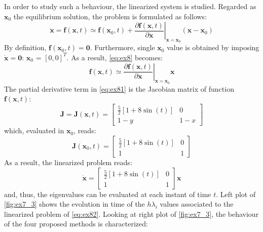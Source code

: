 \documentclass[11pt,a4paper,oneside]{article}
\renewcommand{\vec}[1]{\mathbf{#1}}
\begin{document}
In order to study such a behaviour, the linearized system is studied. Regarded as $\vec{x}_0$ the equilibrium solution, the problem is formulated as follows:
\begin{equation}
    \dot{\vec{x}} = \vec{f}(\vec{x}, t) \simeq \vec{f}(\vec{x}_0, t) + \left.\frac{\partial \vec{f}(\vec{x}, t)}{\partial \vec{x}} \right\rvert_{\vec{x}=\vec{x}_0}(\vec{x}-\vec{x}_0)
    \label{eq:ex8}
\end{equation}
By definition, $\vec{f}(\vec{x}_0,t) = \vec{0}$. Furthermore, single $\vec{x}_0$ value is obtained by imposing $\dot{\vec{x}}=\vec{0}$: $\vec{x}_0$ = $[0, 0]^T$. As a result, \autoref{eq:ex8} becomes:
\begin{equation}
    \vec{f}(\vec{x}, t) \simeq \left.\frac{\partial \vec{f}(\vec{x}, t)}{\partial \vec{x}} \right\rvert_{\vec{x}=\vec{x}_0} \vec{x}
    \label{eq:ex81}
\end{equation}
The partial derivative term in \autoref{eq:ex81} is the Jacobian matrix of function $\vec{f}(\vec{x}, t)$:
\begin{equation}
    \vec{J} = \vec{J}(\vec{x},t) = \begin{bmatrix}
\frac{5}{2}\left[1+8\sin(t)\right] & 0\\
1-y & 1-x
\end{bmatrix}
\end{equation}
which, evaluated in $\vec{x}_0$, reads:
\begin{equation}
    \vec{J}(\vec{x}_0, t) = \begin{bmatrix}
\frac{5}{2}\left[1+8\sin(t)\right] & 0\\
1 & 1
\end{bmatrix}
\end{equation}
As a result, the linearized problem reads:
\begin{equation}
    \dot{\vec{x}}=\begin{bmatrix}
\frac{5}{2}\left[1+8\sin(t)\right] & 0\\
1 & 1
\end{bmatrix}\vec{x}
\label{eq:ex82}
\end{equation}
and, thus, the eigenvalues can be evaluated at each instant of time $t$.
Left plot of \autoref{fig:ex7_3} shows the evolution in time of the $h\lambda_i$ values associated to the linearized problem of \autoref{eq:ex82}. Looking at right plot of \autoref{fig:ex7_3}, the behaviour of the four proposed methods is characterized:
\end{document}
